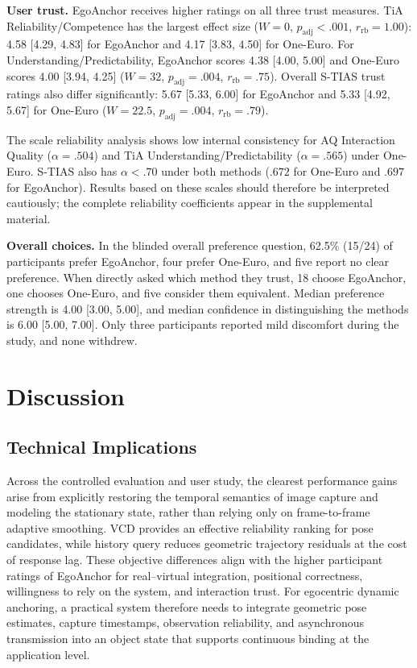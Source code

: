 \documentclass[review]{vgtc}
\begin{document}
\textbf{User trust.}
EgoAnchor receives higher ratings on all three trust measures. TiA Reliability/Competence has the largest effect size ($W=0$, $p_{\mathrm{adj}}<.001$, $r_{\mathrm{rb}}=1.00$): 4.58 [4.29, 4.83] for EgoAnchor and 4.17 [3.83, 4.50] for One-Euro. For Understanding/Predictability, EgoAnchor scores 4.38 [4.00, 5.00] and One-Euro scores 4.00 [3.94, 4.25] ($W=32$, $p_{\mathrm{adj}}=.004$, $r_{\mathrm{rb}}=.75$). Overall S-TIAS trust ratings also differ significantly: 5.67 [5.33, 6.00] for EgoAnchor and 5.33 [4.92, 5.67] for One-Euro ($W=22.5$, $p_{\mathrm{adj}}=.004$, $r_{\mathrm{rb}}=.79$).

The scale reliability analysis shows low internal consistency for AQ Interaction Quality ($\alpha=.504$) and TiA Understanding/Predictability ($\alpha=.565$) under One-Euro. S-TIAS also has $\alpha<.70$ under both methods ($.672$ for One-Euro and $.697$ for EgoAnchor). Results based on these scales should therefore be interpreted cautiously; the complete reliability coefficients appear in the supplemental material.

\textbf{Overall choices.}
In the blinded overall preference question, 62.5\% (15/24) of participants prefer EgoAnchor, four prefer One-Euro, and five report no clear preference. When directly asked which method they trust, 18 choose EgoAnchor, one chooses One-Euro, and five consider them equivalent. Median preference strength is 4.00 [3.00, 5.00], and median confidence in distinguishing the methods is 6.00 [5.00, 7.00]. Only three participants reported mild discomfort during the study, and none withdrew.

\section{Discussion}\label{sec:discussion}

\subsection{Technical Implications}

Across the controlled evaluation and user study, the clearest performance gains arise from explicitly restoring the temporal semantics of image capture and modeling the stationary state, rather than relying only on frame-to-frame adaptive smoothing. VCD provides an effective reliability ranking for pose candidates, while history query reduces geometric trajectory residuals at the cost of response lag. These objective differences align with the higher participant ratings of EgoAnchor for real--virtual integration, positional correctness, willingness to rely on the system, and interaction trust. For egocentric dynamic anchoring, a practical system therefore needs to integrate geometric pose estimates, capture timestamps, observation reliability, and asynchronous transmission into an object state that supports continuous binding at the application level.
\end{document}
